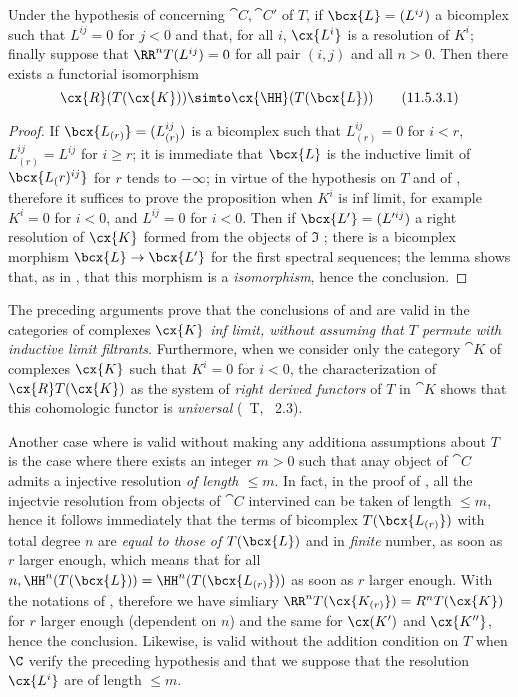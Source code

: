 \begin{proposition}[11.5.3]
\label{0.11.5.3}
Under the hypothesis of  concerning $\cat{C}, \cat{C'}$ of $T$, if $\bcx{L} = (L^{ij})$ a bicomplex such that $L^{ij} = 0$ for $j<0$ and that, for all $i$, 
$\cx{L^i}$ is a resolution of $K^i$; finally suppose that $\RR^n T(L^{ij}) = 0$ for all pair $(i,j)$ and all $n>0$. Then there exists a functorial isomorphism 
\[
  \label{0.11.5.3.1}
  \cx{R}(T(\cx{K}))\simto \cx{\HH}(T(\bcx{L}))
  \tag{11.5.3.1}
\]
\end{proposition}
\begin{proof}
If $\bcx{L_{(r)}} = (L_{(r)}^{ij})$ is a bicomplex such that $L_{(r)}^{ij} = 0$ for $i<r$, $L_{(r)}^{ij} = L^{ij}$ for $i\geq r$;
it is immediate that $\bcx{L}$ is the inductive limit of $\bcx{L_(r)^{ij}}$ for $r$ tends to $-\infty$; 
in virtue of the hypothesis on $T$ and of , therefore it suffices to prove the proposition when $K^i$ is inf limit, for example $K^i=0$ for $i<0$, 
and $L^{ij} = 0$ for $i<0$. Then if $\bcx{L'} = (L'^{ij})$ a right resolution of $\cx{K}$ formed from the objects of $\mathfrak{I}$ ;
there is a bicomplex morphism $\bcx{L}\rightarrow \bcx{L'}$ for the first spectral sequences; the lemma  shows that, as in , 
that this morphism is a \emph{isomorphism}, hence the conclusion.
\end{proof}

\begin{remark}[11.5.4]
\label{0.11.5.4}
The preceding arguments prove that the conclusions of  and  are valid in the categories of complexes $\cx{K}$ 
\emph{inf limit, without assuming that $T$ permute with inductive limit filtrants}. Furthermore, when we consider only the category $\cat{K}$ of complexes $\cx{K}$ such that $K^i=0$ for $i<0$, 
the characterization of $\cx{R} T(\cx{K})$ as the system of \emph{right derived functors} of $T$ in $\cat{K}$ shows that this cohomologic functor is \emph{universal} (~T, ~2.3).

Another case where  is valid without making any additiona assumptions about $T$ is the case where there exists an integer $m>0$ such that anay object of $\cat{C}$ admits a injective resolution \emph{of length $\leq m$}.
In fact, in the proof of , all the injectvie resolution from objects of $\cat{C}$ intervined can be taken of length $\leq m$, hence it follows immediately that the terms of bicomplex $T(\bcx{L_{(r)}})$ with total degree $n$ 
are \emph{equal to those of} $T(\bcx{L})$ and in \emph{finite} number, as soon as $r$ larger enough, which means that for all $n, \HH^n(T(\bcx{L})) = \HH^n(T(\bcx{L_{(r)}}))$ as soon as $r$ larger enough.
With the notations of , therefore we have simliary $\RR^nT(\cx{K_{(r)}}) = R^n T(\cx{K})$ for $r$ larger enough (dependent on $n$) and the same for $\cx(K')$ and $\cx{K''}$, hence the conclusion.
Likewise,  is valid without the addition condition on $T$ when $\C$ verify the preceding hypothesis and that we suppose that the resolution $\cx{L^i}$ are of length $\leq m$.
\end{remark}

